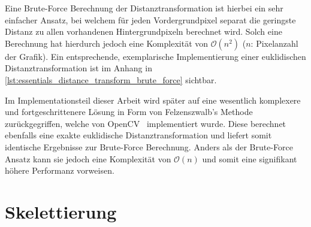 Eine Brute-Force Berechnung der Distanztransformation ist hierbei ein sehr einfacher Ansatz, bei welchem für jeden Vordergrundpixel separat die geringste Distanz zu allen vorhandenen Hintergrundpixeln berechnet wird.
Solch eine Berechnung hat hierdurch jedoch eine Komplexität von \(\mathcal{O}(n^2)\) (\(n\): Pixelanzahl der Grafik).
Ein entsprechende, exemplarische Implementierung einer euklidischen Distanztransformation ist im Anhang in \autoref{lst:essentials_distance_transform_brute_force} sichtbar.

Im Implementationsteil dieser Arbeit wird später auf eine wesentlich komplexere und fortgeschrittenere Lösung in Form von Felzenszwalb's Methode~\cite{DBLP:journals/toc/FelzenszwalbH12} zurückgegriffen, welche von OpenCV~\cite{opencv_library} implementiert wurde.
Diese berechnet ebenfalls eine exakte euklidische Distanztransformation und liefert somit identische Ergebnisse zur Brute-Force Berechnung.
Anders als der Brute-Force Ansatz kann sie jedoch eine Komplexität von \(\mathcal{O}(n)\) und somit eine signifikant höhere Performanz vorweisen.

\clearpage
\section{Skelettierung}%
\label{sec:essentials_skeletonization}


